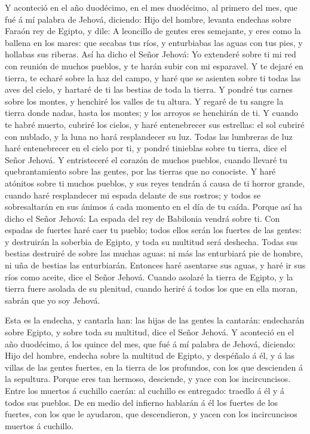  Y aconteció en el año duodécimo, en el mes duodécimo, al
primero del mes, que fué á mí palabra de Jehová, diciendo: 
Hijo del hombre, levanta endechas sobre Faraón rey de Egipto, y dile: A
leoncillo de gentes eres semejante, y eres como la ballena en los mares:
que secabas tus ríos, y enturbiabas las aguas con tus pies, y hollabas
sus riberas.  Así ha dicho el Señor Jehová: Yo extenderé
sobre ti mi red con reunión de muchos pueblos, y te harán subir con mi
esparavel.  Y te dejaré en tierra, te echaré sobre la haz
del campo, y haré que se asienten sobre ti todas las aves del cielo, y
hartaré de ti las bestias de toda la tierra.  Y pondré tus
carnes sobre los montes, y henchiré los valles de tu altura.
 Y regaré de tu sangre la tierra donde nadas, hasta los
montes; y los arroyos se henchirán de ti.  Y cuando te habré
muerto, cubriré los cielos, y haré entenebrecer sus estrellas: el sol
cubriré con nublado, y la luna no hará resplandecer su luz. 
Todas las lumbreras de luz haré entenebrecer en el cielo por ti, y
pondré tinieblas sobre tu tierra, dice el Señor Jehová.  Y
entristeceré el corazón de muchos pueblos, cuando llevaré tu
quebrantamiento sobre las gentes, por las tierras que no conociste.
 Y haré atónitos sobre ti muchos pueblos, y sus reyes
tendrán á causa de ti horror grande, cuando haré resplandecer mi espada
delante de sus rostros; y todos se sobresaltarán en sus ánimos á cada
momento en el día de tu caída.  Porque así ha dicho el
Señor Jehová: La espada del rey de Babilonia vendrá sobre ti.
 Con espadas de fuertes haré caer tu pueblo; todos ellos
serán los fuertes de las gentes: y destruirán la soberbia de Egipto, y
toda su multitud será deshecha.  Todas sus bestias
destruiré de sobre las muchas aguas: ni más las enturbiará pie de
hombre, ni uña de bestias las enturbiarán.  Entonces haré
asentarse sus aguas, y haré ir sus ríos como aceite, dice el Señor
Jehová.  Cuando asolaré la tierra de Egipto, y la tierra
fuere asolada de su plenitud, cuando heriré á todos los que en ella
moran, sabrán que yo soy Jehová.

 Esta es la endecha, y cantarla han: las hijas de las
gentes la cantarán: endecharán sobre Egipto, y sobre toda su multitud,
dice el Señor Jehová.  Y aconteció en el año duodécimo, á
los quince del mes, que fué á mí palabra de Jehová, diciendo:
 Hijo del hombre, endecha sobre la multitud de Egipto, y
despéñalo á él, y á las villas de las gentes fuertes, en la tierra de
los profundos, con los que descienden á la sepultura. 
Porque eres tan hermoso, desciende, y yace con los incircuncisos.
 Entre los muertos á cuchillo caerán: al cuchillo es
entregado: traedlo á él y á todos sus pueblos.  De en medio
del infierno hablarán á él los fuertes de los fuertes, con los que le
ayudaron, que descendieron, y yacen con los incircuncisos muertos á
cuchillo.

